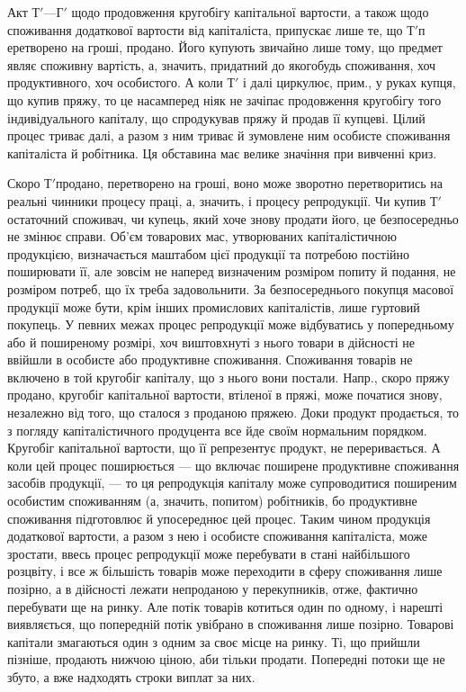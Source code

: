 Акт $Т' — Г'$ щодо продовження кругобігу капітальної вартости, а
також щодо споживання додаткової вартости від капіталіста, припускає
лише те, що $Т' п$еретворено на гроші, продано. Його купують звичайно
лише тому, що предмет являє споживну вартість, а, значить, придатний
до якогобудь споживання, хоч продуктивного, хоч особистого. А коли
$Т'$ і далі циркулює, прим., у руках купця, що купив пряжу, то
це насамперед ніяк не зачіпає продовження кругобігу того індивідуального
капіталу, що спродукував пряжу й продав її купцеві. Цілий процес
триває далі, а разом з ним триває й зумовлене ним особисте споживання
капіталіста й робітника. Ця обставина має велике значіння при вивченні
криз.

Скоро $Т' п$родано, перетворено на гроші, воно може зворотно перетворитись
на реальні чинники процесу праці, а, значить, і процесу репродукції.
Чи купив $Т'$ остаточний споживач, чи купець, який хоче знову продати
його, це безпосередньо не змінює справи. Об’єм товарових мас, утворюваних
капіталістичною продукцією, визначається маштабом цієї продукції
та потребою постійно поширювати її, але зовсім не наперед визначеним
розміром попиту й подання, не розміром потреб, що їх треба задовольнити.
За безпосереднього покупця масової продукції може бути, крім
інших промислових капіталістів, лише гуртовий покупець. У певних
межах процес репродукції може відбуватись у попередньому або й
поширеному розмірі, хоч виштовхнуті з нього товари в дійсності не
ввійшли в особисте або продуктивне споживання. Споживання товарів не
включено в той кругобіг капіталу, що з нього вони постали. Напр.,
скоро пряжу продано, кругобіг капітальної вартости, втіленої в пряжі,
може початися знову, незалежно від того, що сталося з проданою пряжею.
Доки продукт продається, то з погляду капіталістичного продуцента
все йде своїм нормальним порядком. Кругобіг капітальної вартости, що
її репрезентує продукт, не переривається. А коли цей процес поширюється
— що включає поширене продуктивне споживання засобів продукції,
— то ця репродукція капіталу може супроводитися поширеним
особистим споживанням (а, значить, попитом) робітників, бо продуктивне
споживання підготовлює й упосереднює цей процес. Таким
чином продукція додаткової вартости, а разом з нею і особисте
споживання капіталіста, може зростати, ввесь процес репродукції може
перебувати в стані найбільшого розцвіту, і все ж більшість товарів
може переходити в сферу споживання лише позірно, а в
дійсності лежати непроданою у перекупників, отже, фактично перебувати
ще на ринку. Але потік товарів котиться один по одному, і нарешті
виявляється, що попередній потік увібрано в споживання лише позірно.
Товарові капітали змагаються один з одним за своє місце на ринку. Ті,
що прийшли пізніше, продають нижчою ціною, аби тільки продати.
Попередні потоки ще не збуто, а вже надходять строки виплат за них.
\parbreak{}  %
